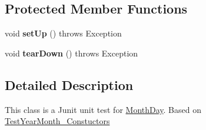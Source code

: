 \subsection*{Protected Member Functions}
\begin{DoxyCompactItemize}
\item 
\hypertarget{classorg_1_1joda_1_1time_1_1_test_month_day___constructors_a3163bbc67dfb5b25c98f0b6f57d7ae61}{void {\bfseries set\-Up} ()  throws Exception }\label{classorg_1_1joda_1_1time_1_1_test_month_day___constructors_a3163bbc67dfb5b25c98f0b6f57d7ae61}

\item 
\hypertarget{classorg_1_1joda_1_1time_1_1_test_month_day___constructors_a5eca2caa19b12dea8df4b71b141e89a5}{void {\bfseries tear\-Down} ()  throws Exception }\label{classorg_1_1joda_1_1time_1_1_test_month_day___constructors_a5eca2caa19b12dea8df4b71b141e89a5}

\end{DoxyCompactItemize}


\subsection{Detailed Description}
This class is a Junit unit test for \hyperlink{classorg_1_1joda_1_1time_1_1_month_day}{Month\-Day}. Based on \hyperlink{}{Test\-Year\-Month\-\_\-\-Constuctors} 

